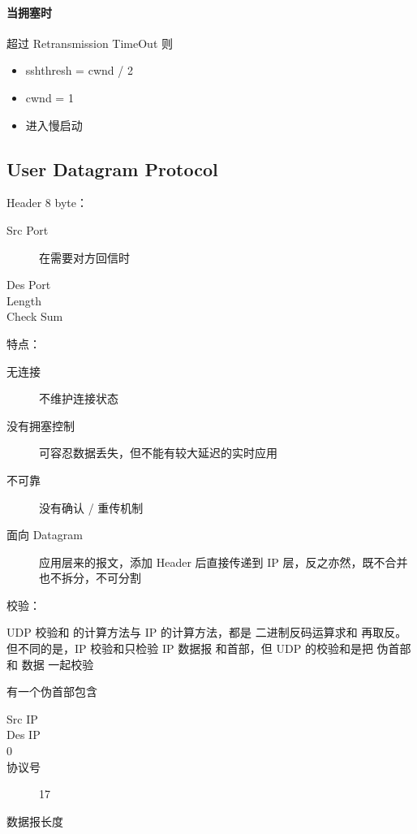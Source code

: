 \documentclass[11pt,journal,compsoc]{IEEEtran}
\begin{document}
\paragraph{当拥塞时}

超过 Retransmission TimeOut 则

\begin{itemize}
    \item sshthresh = cwnd / 2
    \item cwnd = 1
    \item 进入慢启动
\end{itemize}


\subsection{User Datagram Protocol}

Header 8 byte：

\begin{description}
    \item[Src Port] 在需要对方回信时

    \item[Des Port] 

    \item[Length] 

    \item[Check Sum] 
\end{description}

特点：

\begin{description}
    \item[无连接] 不维护连接状态

    \item[没有拥塞控制] 可容忍数据丢失，但不能有较大延迟的实时应用

    \item[不可靠] 没有确认 / 重传机制

    \item[面向 Datagram] 应用层来的报文，添加 Header 后直接传递到 IP 层，反之亦然，既不合并也不拆分，不可分割
\end{description}

校验：

UDP 校验和 的计算方法与 IP 的计算方法，都是 二进制反码运算求和 再取反。但不同的是，IP 校验和只检验 IP 数据报 和首部，但 UDP 的校验和是把 伪首部 和 数据 一起校验

有一个伪首部包含

\begin{description}
    \item[Src IP]

    \item[Des IP] 

    \item[0] 

    \item[协议号] 17

    \item[数据报长度] 
\end{description}
\end{document}
